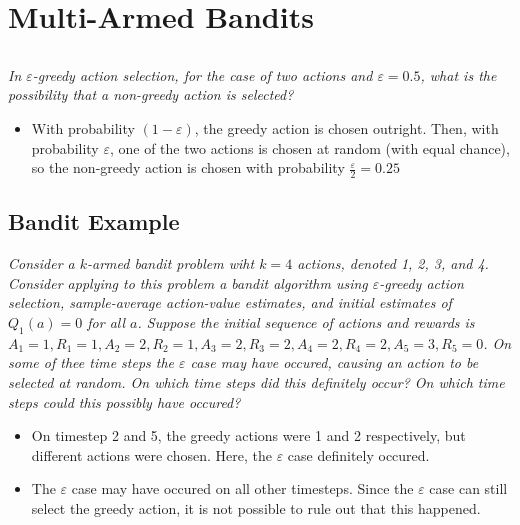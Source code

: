 \documentclass{article}
\begin{document}
\setcounter{section}{1}
\section{Multi-Armed Bandits}
\subsection{}
\textit{In $\varepsilon$-greedy action selection, for the case of two actions and $\varepsilon = 0.5$, what is the possibility that a non-greedy action is selected?}
\begin{itemize}
\item With probability $(1 - \varepsilon)$, the greedy action is chosen outright. Then, with probability $\varepsilon$, one of the two actions is chosen at random (with equal chance), so the non-greedy action is chosen with probability $\frac{\varepsilon}{2} = 0.25$
\end{itemize}

\subsection{Bandit Example}
\textit{Consider a $k$-armed bandit problem wiht $k=4$ actions, denoted 1, 2, 3, and 4. Consider applying to this problem a bandit algorithm using $\varepsilon$-greedy action selection, sample-average action-value estimates, and initial estimates of $Q_1(a) = 0$ for all $a$. Suppose the initial sequence of actions and rewards is $A_1 = 1, R_1 = 1, A_2 = 2, R_2 = 1, A_3 = 2, R_3 = 2, A_4 = 2, R_4 = 2, A_5 = 3, R_5 = 0$. On some of thee time steps the $\varepsilon$ case may have occured, causing an action to be selected at random. On which time steps did this definitely occur? On which time steps could this possibly have occured?}
\begin{itemize}
\item On timestep 2 and 5, the greedy actions were 1 and 2 respectively, but different actions were chosen. Here, the $\varepsilon$ case definitely occured.
\item The $\varepsilon$ case may have occured on all other timesteps. Since the $\varepsilon$ case can still select the greedy action, it is not possible to rule out that this happened.
\end{itemize}
\end{document}
